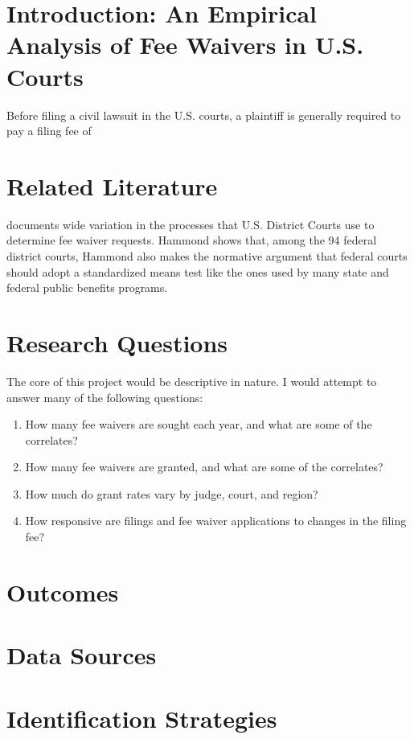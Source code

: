 \documentclass{article}
\begin{document}
\onehalfspacing
\newpage

\section{Introduction: An Empirical Analysis of Fee Waivers in U.S. Courts}

Before filing a civil lawsuit in the U.S. courts, a plaintiff is generally required to pay a filing fee of 

\section{Related Literature}

\cite{Hammond:2019aa} documents wide variation in the processes that U.S. District Courts use to determine fee waiver requests. Hammond shows that, among the 94 federal district courts,
Hammond also makes the normative argument that federal courts should adopt a standardized means test like the ones used by many state and federal public benefits programs.

\section{Research Questions}
The core of this project would be descriptive in nature. I would attempt to answer many of the following questions:
\begin{enumerate}
\item How many fee waivers are sought each year, and what are some of the correlates?
\item How many fee waivers are granted, and what are some of the correlates?
\item How much do grant rates vary by judge, court, and region?
\item How responsive are filings and fee waiver applications to changes in the filing fee?
\end{enumerate}


\section{Outcomes}

\section{Data Sources}

\section{Identification Strategies}



\end{document}
